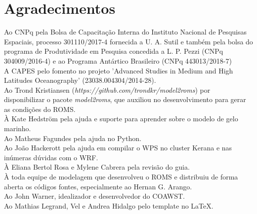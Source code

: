 \chapter*{Agradecimentos}




\noindent Ao CNPq pela Bolsa de Capacitação Interna do Instituto Nacional de Pesquisas Espaciais, processo 301110/2017-4 fornecida a U. A. Sutil e também pela bolsa do programa de Produtividade em Pesquisa concedida a L. P. Pezzi (CNPq 304009/2016-4) e ao Programa Antártico Brasileiro (CNPq 443013/2018-7) \\

\noindent A CAPES pelo fomento no projeto 'Advanced Studies in Medium and High Latitudes Oceanography' (23038.004304/2014-28). \\

\noindent Ao Trond Kristiansen (\textcolor{bleu_cite}{\textit{https://github.com/trondkr/model2roms}}) por disponibilizar o pacote \textit{model2roms}, que auxiliou no desenvolvimento para gerar as condições do ROMS. \\

\noindent À Kate Hedström pela ajuda e suporte para aprender sobre o modelo de gelo marinho. \\

\noindent Ao Matheus Fagundes pela ajuda no Python. \\

\noindent Ao João Hackerott pela ajuda em compilar o WPS no cluster Kerana e nas inúmeras dúvidas com o WRF. \\

\noindent À Eliana Bertol Rosa e Mylene Cabrera pela revisão do guia. \\

\noindent À toda equipe de modelagem que desenvolveu o ROMS e distribuiu de forma aberta os códigos fontes, especialmente ao Hernan G. Arango.\\

\noindent Ao John Warner, idealizador e desenvolvedor do COAWST. \\

\noindent Ao Mathias Legrand, Vel e Andrea Hidalgo pelo template no \LaTeX.

